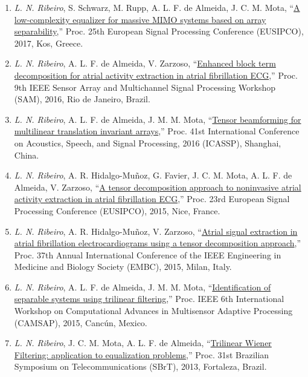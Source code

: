 \begin{enumerate}
	\item \emph{L. N. Ribeiro}, S. Schwarz, M. Rupp, A. L. F. de Almeida, J. C. M. Mota, ``\href{https://doi.org/10.23919/EUSIPCO.2017.8081651}{A low-complexity equalizer for massive MIMO systems based on array separability},'' Proc. 25th European Signal Processing Conference (EUSIPCO), 2017, Kos, Greece.
	
	\item \emph{L. N. Ribeiro}, A. L. F. de Almeida, V. Zarzoso, ``\href{https://doi.org/10.1109/SAM.2016.7569709}{Enhanced block term decomposition for atrial activity extraction in atrial fibrillation ECG},'' Proc. 9th IEEE Sensor Array and Multichannel Signal Processing Workshop (SAM), 2016, Rio de Janeiro, Brazil.
	
	\item \emph{L. N. Ribeiro},  A. L. F. de Almeida, J. M. M. Mota, ``\href{https://doi.org/10.1109/ICASSP.2016.7472221}{Tensor beamforming for multilinear translation invariant arrays},'' Proc. 41st International Conference on Acoustics, Speech, and Signal Processing, 2016 (ICASSP), Shanghai, China.
	
	\item  \emph{L. N. Ribeiro}, A. R. Hidalgo-Mu\~{n}oz, G. Favier, J. C. M. Mota, A. L. F. de Almeida,  V. Zarzoso, ``\href{https://doi.org/10.1109/EUSIPCO.2015.7362850}{A tensor decomposition approach to noninvasive atrial activity extraction in atrial fibrillation ECG},'' Proc. 23rd European Signal Processing Conference (EUSIPCO), 2015, Nice, France.
	
	\item \emph{L. N. Ribeiro}, A. R. Hidalgo-Mu\~{n}oz, V. Zarzoso, ``\href{https://doi.org/10.1109/EMBC.2015.7320000}{Atrial signal extraction in atrial fibrillation electrocardiograms using a tensor decomposition approach},'' Proc. 37th Annual International Conference of the IEEE Engineering in Medicine and Biology Society (EMBC), 2015, Milan, Italy.
	
	 \item \emph{L. N. Ribeiro},  A. L. F. de Almeida, J. M. M. Mota, ``\href{https://doi.org/10.1109/CAMSAP.2015.7383768}{Identification of separable systems using trilinear filtering},'' Proc. IEEE 6th International Workshop on Computational Advances in Multisensor Adaptive Processing (CAMSAP), 2015, Canc\'{u}n, Mexico.
	
	 \item \emph{L. N. Ribeiro}, J. C. M. Mota, A. L. F. de Almeida, ``\href{https://github.com/lnribeiro/lnribeiro.github.io/blob/master/assets/pdf/sbrt13.pdf}{Trilinear Wiener Filtering: application to equalization problems},''  Proc. 31st Brazilian Symposium on Telecommunications (SBrT), 2013, Fortaleza, Brazil.
\end{enumerate}